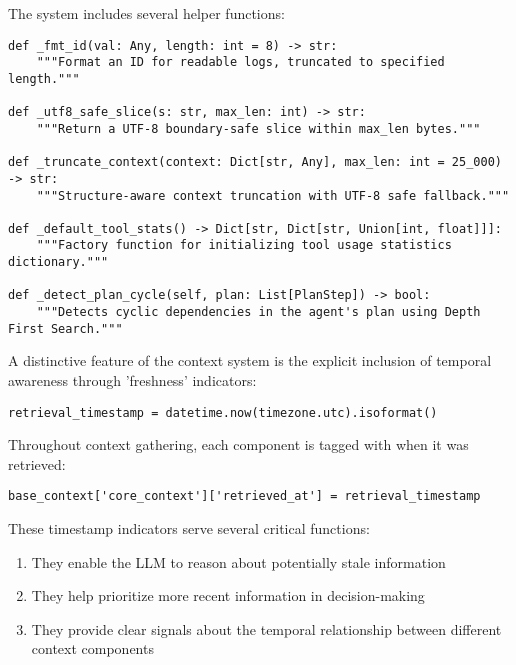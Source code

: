 \documentclass[12pt,a4paper]{article}
\begin{document}
The system includes several helper functions:
\begin{pageablecode}
\begin{verbatim}
def _fmt_id(val: Any, length: int = 8) -> str:
    """Format an ID for readable logs, truncated to specified length."""

def _utf8_safe_slice(s: str, max_len: int) -> str:
    """Return a UTF-8 boundary-safe slice within max_len bytes."""

def _truncate_context(context: Dict[str, Any], max_len: int = 25_000) -> str:
    """Structure-aware context truncation with UTF-8 safe fallback."""

def _default_tool_stats() -> Dict[str, Dict[str, Union[int, float]]]:
    """Factory function for initializing tool usage statistics dictionary."""

def _detect_plan_cycle(self, plan: List[PlanStep]) -> bool:
    """Detects cyclic dependencies in the agent's plan using Depth First Search."""
\end{verbatim}
\end{pageablecode}

A distinctive feature of the context system is the explicit inclusion of temporal awareness through 'freshness' indicators:
\begin{pageablecode}
\begin{verbatim}
retrieval_timestamp = datetime.now(timezone.utc).isoformat()
\end{verbatim}
\end{pageablecode}
Throughout context gathering, each component is tagged with when it was retrieved:
\begin{pageablecode}
\begin{verbatim}
base_context['core_context']['retrieved_at'] = retrieval_timestamp
\end{verbatim}
\end{pageablecode}
These timestamp indicators serve several critical functions:
\begin{enumerate}[label=\arabic*.]
    \item They enable the LLM to reason about potentially stale information
    \item They help prioritize more recent information in decision-making
    \item They provide clear signals about the temporal relationship between different context components
\end{enumerate}
\end{document}
